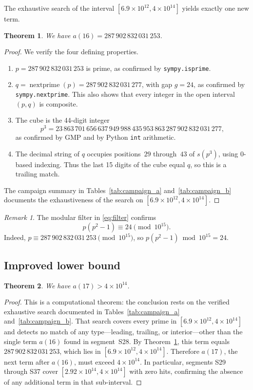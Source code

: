 \documentclass[11pt]{article}
\newtheorem{theorem}{Theorem}
\theoremstyle{definition}
\theoremstyle{remark}
\newtheorem{remark}{Remark}
\newcommand{\np}{\operatorname{nextprime}}
\begin{document}
The exhaustive search of the interval $[6.9 \times 10^{12},
4 \times 10^{14}]$ yields exactly one new term.

\begin{theorem}
\label{thm:a16}
We have $a(16) = 287\,902\,832\,031\,253$.
\end{theorem}

\begin{proof}
We verify the four defining properties.
\begin{enumerate}
\item $p = 287\,902\,832\,031\,253$ is prime, as confirmed by
      \texttt{sympy.isprime}.
\item $q = \np(p) = 287\,902\,832\,031\,277$, with gap $g = 24$,
      as confirmed by \texttt{sympy.nextprime}.
      This also shows that every integer in the open interval
      $(p, q)$ is composite.
\item The cube is the 44-digit integer
      \[
      p^3 = 23\,863\,701\,656\,637\,949\,988\,435\,953\,863\,
      287\,902\,832\,031\,277,
      \]
      as confirmed by GMP and by Python \texttt{int} arithmetic.
\item The decimal string of $q$ occupies positions~$29$ through~$43$
      of $s(p^3)$, using 0-based indexing.
      Thus the last 15 digits of the cube equal $q$, so this is a
      trailing match.
\end{enumerate}
The campaign summary in Tables~\ref{tab:campaign_a}
and~\ref{tab:campaign_b} documents the exhaustiveness of the search
on $[6.9 \times 10^{12}, 4 \times 10^{14}]$.
\end{proof}

\begin{remark}
The modular filter in \eqref{eq:filter} confirms
\[
  p(p^2 - 1) \equiv 24 \pmod{10^{15}}.
\]
Indeed, $p \equiv 287\,902\,832\,031\,253 \pmod{10^{15}}$,
so $p(p^2 - 1) \bmod 10^{15} = 24$.
\end{remark}

\subsection{Improved lower bound}
\label{sec:lowerbound}

\begin{theorem}
\label{thm:a17}
We have $a(17) > 4 \times 10^{14}$.
\end{theorem}

\begin{proof}
This is a computational theorem: the conclusion rests on the verified
exhaustive search documented in Tables~\ref{tab:campaign_a}
and~\ref{tab:campaign_b}.
That search covers every prime in $[6.9 \times 10^{12},
4 \times 10^{14}]$ and detects no match of any type---leading,
trailing, or interior---other than the single term $a(16)$ found in
segment~S28.
By Theorem~\ref{thm:a16}, this term equals
$287\,902\,832\,031\,253$, which lies in
$[6.9 \times 10^{12}, 4 \times 10^{14}]$.
Therefore $a(17)$, the next term after $a(16)$, must exceed
$4 \times 10^{14}$.
In particular, segments S29 through S37 cover
$[2.92 \times 10^{14}, 4 \times 10^{14}]$ with zero hits,
confirming the absence of any additional term in that sub-interval.
\end{proof}
\end{document}
